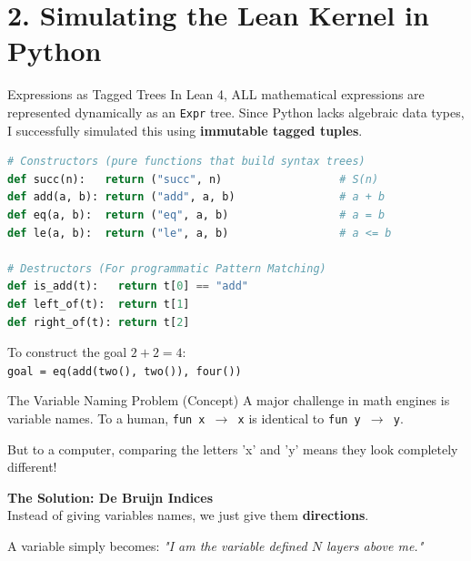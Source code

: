 \documentclass[aspectratio=169, 10pt]{beamer}
\begin{document}
\section{2. Simulating the Lean Kernel in Python}

\begin{frame}[fragile]{Expressions as Tagged Trees}
    In Lean 4, ALL mathematical expressions are represented dynamically as an \texttt{Expr} tree. Since Python lacks algebraic data types, I successfully simulated this using \textbf{immutable tagged tuples}.

\begin{lstlisting}[language=Python]
# Constructors (pure functions that build syntax trees)
def succ(n):   return ("succ", n)                  # S(n)
def add(a, b): return ("add", a, b)                # a + b
def eq(a, b):  return ("eq", a, b)                 # a = b
def le(a, b):  return ("le", a, b)                 # a <= b

# Destructors (For programmatic Pattern Matching)
def is_add(t):   return t[0] == "add"
def left_of(t):  return t[1]
def right_of(t): return t[2]
\end{lstlisting}

    To construct the goal $2 + 2 = 4$:
    \\\texttt{goal = eq(add(two(), two()), four())}
\end{frame}

\begin{frame}[fragile]{The Variable Naming Problem (Concept)}
    A major challenge in math engines is variable names. To a human, \texttt{fun x $\rightarrow$ x} is identical to \texttt{fun y $\rightarrow$ y}. 
    
    But to a computer, comparing the letters 'x' and 'y' means they look completely different!
    
    \vspace{1em}
    \textbf{The Solution: De Bruijn Indices} \\
    Instead of giving variables names, we just give them \textbf{directions}. 
    
    A variable simply becomes: \textit{"I am the variable defined $N$ layers above me."}
\end{frame}
\end{document}

